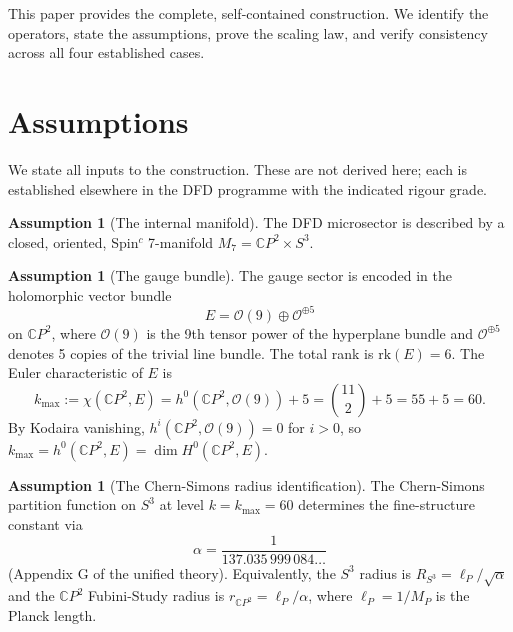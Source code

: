 \documentclass[11pt]{article}
\theoremstyle{definition}
\newtheorem{assumption}[theorem]{Assumption}
\theoremstyle{remark}
\newcommand{\CP}{\mathbb{C}P}
\newcommand{\Mp}{M_P}
\begin{document}
This paper provides the complete, self-contained construction. We
identify the operators, state the assumptions, prove the scaling law,
and verify consistency across all four established cases.


\section{Assumptions}
\label{sec:assumptions}

We state all inputs to the construction. These are not derived here;
each is established elsewhere in the DFD programme with the indicated
rigour grade.

\begin{assumption}[The internal manifold]
\label{ass:manifold}
The DFD microsector is described by a closed, oriented, Spin$^c$
7-manifold $M_7 = \CP^2 \times S^3$.
\end{assumption}

\begin{assumption}[The gauge bundle]
\label{ass:bundle}
The gauge sector is encoded in the holomorphic vector bundle
\begin{equation}
E = \mathcal{O}(9) \oplus \mathcal{O}^{\oplus 5}
\end{equation}
on $\CP^2$, where $\mathcal{O}(9)$ is the 9th tensor power of the
hyperplane bundle and $\mathcal{O}^{\oplus 5}$ denotes 5 copies of the
trivial line bundle. The total rank is $\mathrm{rk}(E) = 6$. The
Euler characteristic of $E$ is
\begin{equation}
\label{eq:kmax}
k_{\max} := \chi(\CP^2, E) = h^0(\CP^2, \mathcal{O}(9)) + 5
= \binom{11}{2} + 5 = 55 + 5 = 60.
\end{equation}
By Kodaira vanishing, $h^i(\CP^2, \mathcal{O}(9)) = 0$ for $i > 0$,
so $k_{\max} = h^0(\CP^2, E) = \dim H^0(\CP^2, E)$.
\end{assumption}

\begin{assumption}[The Chern-Simons radius identification]
\label{ass:CS}
The Chern-Simons partition function on $S^3$ at level $k = k_{\max} = 60$
determines the fine-structure constant via
\begin{equation}
\label{eq:CS-alpha}
\alpha = \frac{1}{137.035\,999\,084\ldots}
\end{equation}
(Appendix G of the unified theory). Equivalently, the $S^3$ radius is
$R_{S^3} = \ell_P / \sqrt{\alpha}$ and the $\CP^2$ Fubini-Study radius
is $r_{\CP^2} = \ell_P / \alpha$, where $\ell_P = 1/\Mp$ is the Planck
length.
\end{assumption}
\end{document}

